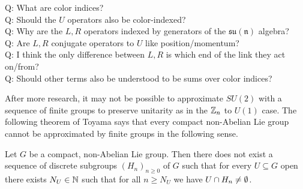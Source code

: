 \documentclass[10pt,reqno]{amsart}
\begin{document}
	\noindent Q: What are color indices?\\
	Q: Should the $U$ operators also be color-indexed?\\
	Q: Why are the $L,R$ operators indexed by generators of the $\mathfrak{su(n)}$ algebra?\\
	Q: Are $L,R$ conjugate operators to $U$ like position/momentum?\\
	Q: I think the only difference between $L,R$ is which end of the link they act on/from?\\
	Q: Should other terms also be understood to be sums over color indices? 
	
	After more research, it may not be possible to approximate $SU(2)$ with a sequence of finite groups to preserve unitarity as in the $\mathbb{Z}_n$ to $U(1)$ case. 
	The following theorem of Toyama says that every compact non-Abelian Lie group cannot be approximated by finite groups in the following sense.
	\begin{theorem}
		Let $G$ be a compact, non-Abelian Lie group. Then there does not exist a sequence of discrete subgroups $(H_n)_{n\geq 0}$ of $G$ such that for every $U \subseteq G$ open there exists $N_U \in \mathbb{N}$ such that for all $n \geq N_U$ we have $U \cap H_n \neq \emptyset$.
	\end{theorem}
	
	
	
	\nocite{Hamer82}
\end{document}
